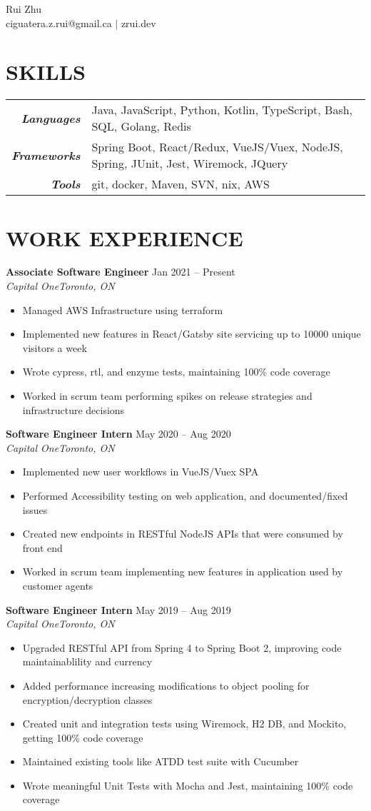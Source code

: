 \documentclass[letterpaper]{article}
\newcommand{\Header}[2]{\begin{center}
	\Huge\usefont{OT1}{lmss}{m}{n}
		#1 \\
	\small #2 \\
	\normalsize \normalfont
\end{center}}
\newcommand{\SplitEntry}[2]{\textbf{\textit{#1}} & #2\\}
\newcommand{\NewPart}[1]{\section*{\uppercase{\textbf{#1}}}}
\newcommand{\DatedEntry}[5]{\large\textbf{#1}
	\hfill #2\\\normalsize
	\textit{#3}\hfill\textit{#4}\\\vspace{0.10cm}
	#5
}
\begin{document}
\Header{Rui Zhu}{ciguatera.z.rui@gmail.ca $|$ zrui.dev}

\NewPart{Skills}{}
\begin{tabular}{r|l}
	\SplitEntry{Languages}{Java, JavaScript, Python, Kotlin, TypeScript, Bash, SQL, Golang, Redis}
	\SplitEntry{Frameworks}{Spring Boot, React/Redux, VueJS/Vuex, NodeJS, Spring, JUnit, Jest, Wiremock, JQuery}
	\SplitEntry{Tools}{git, docker, Maven, SVN, nix, AWS}
\end{tabular}

\NewPart{Work Experience}{}
\DatedEntry{Associate Software Engineer}
{Jan 2021 -- Present}
{Capital One}
{Toronto, ON}
{\begin{itemize}[nolistsep]
	\item Managed AWS Infrastructure using terraform
	\item Implemented new features in React/Gatsby site servicing up to 10000 unique visitors a week
	\item Wrote cypress, rtl, and enzyme tests, maintaining 100\% code coverage
	\item Worked in scrum team performing spikes on release strategies and infrastructure decisions
\end{itemize}}
\DatedEntry{Software Engineer Intern}
{May 2020 -- Aug 2020}
{Capital One}
{Toronto, ON}
{\begin{itemize}[nolistsep]
	\item Implemented new user workflows in VueJS/Vuex SPA
	\item Performed Accessibility testing on web application, and documented/fixed issues
	\item Created new endpoints in RESTful NodeJS APIs that were consumed by front end
	\item Worked in scrum team implementing new features in application used by customer agents
\end{itemize}}
\DatedEntry{Software Engineer Intern}
{May 2019 -- Aug 2019}
{Capital One}
{Toronto, ON}
{\begin{itemize}[nolistsep]
	\item Upgraded RESTful API from Spring 4 to Spring Boot 2, improving code maintainablility and currency
	\item Added performance increasing modifications to object pooling for encryption/decryption classes
	\item Created unit and integration tests using Wiremock, H2 DB, and Mockito, getting 100\% code coverage
	\item Maintained existing tools like ATDD test suite with Cucumber
	\item Wrote meaningful Unit Tests with Mocha and Jest, maintaining 100\% code coverage
\end{itemize}}
\end{document}
